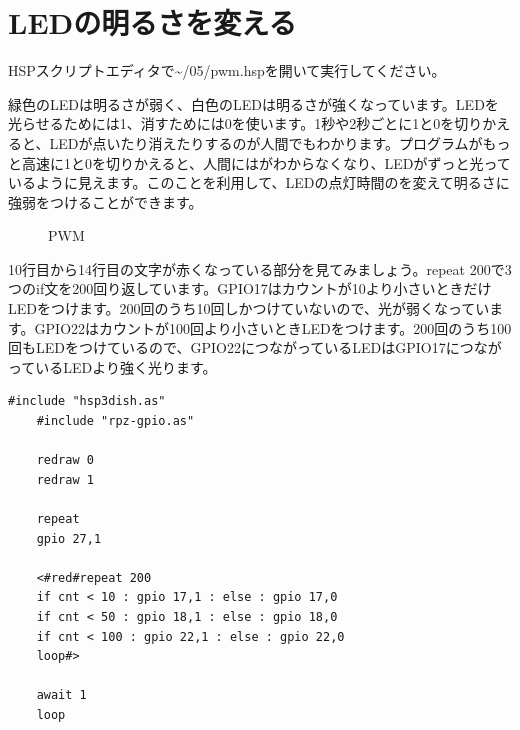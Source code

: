 \documentclass[text05.tex]{subfiles}
\begin{document}
\section{LEDの明るさを変える}
HSPスクリプトエディタで\textasciitilde /05/pwm.hspを開いて実行してください。

緑色のLEDは明るさが弱く、白色のLEDは明るさが強くなっています。LEDを光らせるためには1、消すためには0を使います。1秒や2秒ごとに1と0を切りかえると、LEDが点いたり消えたりするのが人間でもわかります。プログラムがもっと高速に1と0を切りかえると、人間にはがわからなくなり、LEDがずっと光っているように見えます。このことを利用して、LEDの点灯時間のを変えて明るさに強弱をつけることができます。

\begin{figure}[H]
\centering

\caption{PWM}
\end{figure}

10行目から14行目の文字が赤くなっている部分を見てみましょう。repeat 200で3つのif文を200回り返しています。GPIO17はカウントが10より小さいときだけLEDをつけます。200回のうち10回しかつけていないので、光が弱くなっています。GPIO22はカウントが100回より小さいときLEDをつけます。200回のうち100回もLEDをつけているので、GPIO22につながっているLEDはGPIO17につながっているLEDより強く光ります。

\begin{lstlisting}[caption=pwm.hsp,label=pwm.hsp]
    #include "hsp3dish.as"
    #include "rpz-gpio.as"
    
    redraw 0
    redraw 1
    
    repeat
    gpio 27,1
    
    <#red#repeat 200
    if cnt < 10 : gpio 17,1 : else : gpio 17,0
    if cnt < 50 : gpio 18,1 : else : gpio 18,0
    if cnt < 100 : gpio 22,1 : else : gpio 22,0
    loop#>
    
    await 1
    loop
    \end{lstlisting}
\end{document}
